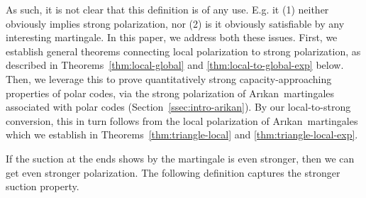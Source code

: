 \documentclass[11pt]{article}
\newcommand{\Arikan}{Ar\i kan}
\begin{document}

As such, it is not clear that this definition is of any use. E.g. it (1) neither obviously implies strong polarization, nor (2) is it obviously satisfiable by any interesting martingale.  In this paper, we address both these issues. First, we establish general theorems connecting local polarization to strong polarization, as described in Theorems~\ref{thm:local-global} and \ref{thm:local-to-global-exp} below. Then, we leverage this to prove quantitatively strong capacity-approaching properties of polar codes, via the strong polarization of \Arikan\ martingales associated with polar codes (Section~\ref{ssec:intro-arikan}). By our local-to-strong conversion, this in turn follows from the local polarization of \Arikan\ martingales which we establish in Theorems~\ref{thm:triangle-local} and \ref{thm:triangle-local-exp}.



If the suction at the ends shows by the martingale is even stronger, then we can get even stronger polarization. The following
definition captures the stronger suction property.
\end{document}
